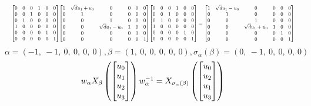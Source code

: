\documentclass[11pt]{article}
\theoremstyle{definition}
\begin{document}
\[
\scaletoalign{\textwidth}{{\left[\begin{matrix}0 & 0 & 0 & 1 & 0 & 0\\0 & 0 & 1 & 0 & 0 & 0\\0 & 1 & 0 & 0 & 0 & 0\\1 & 0 & 0 & 0 & 0 & 0\\0 & 0 & 0 & 0 & 1 & 0\\0 & 0 & 0 & 0 & 0 & 1\end{matrix}\right]} {\left[\begin{matrix}1 & \sqrt{d} u_{1} + u_{0} & 0 & 0 & 0 & 0\\0 & 1 & 0 & 0 & 0 & 0\\0 & 0 & 1 & 0 & 0 & 0\\0 & 0 & \sqrt{d} u_{1} - u_{0} & 1 & 0 & 0\\0 & 0 & 0 & 0 & 1 & 0\\0 & 0 & 0 & 0 & 0 & 1\end{matrix}\right]} {\left[\begin{matrix}0 & 0 & 0 & 1 & 0 & 0\\0 & 0 & 1 & 0 & 0 & 0\\0 & 1 & 0 & 0 & 0 & 0\\1 & 0 & 0 & 0 & 0 & 0\\0 & 0 & 0 & 0 & 1 & 0\\0 & 0 & 0 & 0 & 0 & 1\end{matrix}\right]} = {\left[\begin{matrix}1 & \sqrt{d} u_{1} - u_{0} & 0 & 0 & 0 & 0\\0 & 1 & 0 & 0 & 0 & 0\\0 & 0 & 1 & 0 & 0 & 0\\0 & 0 & \sqrt{d} u_{1} + u_{0} & 1 & 0 & 0\\0 & 0 & 0 & 0 & 1 & 0\\0 & 0 & 0 & 0 & 0 & 1\end{matrix}\right]}}
\]
\[
\alpha = \left( -1, \  -1, \  0, \  0, \  0, \  0\right), \beta = \left( 1, \  0, \  0, \  0, \  0, \  0\right), \sigma_{\alpha}(\beta) = \left( 0, \  -1, \  0, \  0, \  0, \  0\right)
\]
\[
\scaletoalign{\textwidth}{w_{\alpha} X_{\beta}\left(\left[\begin{matrix}u_{0}\\u_{1}\\u_{2}\\u_{3}\end{matrix}\right]\right) w_{\alpha}^{-1} = X_{\sigma_{\alpha}\left(\beta\right)}\left(\left[\begin{matrix}u_{0}\\u_{2}\\u_{1}\\u_{3}\end{matrix}\right]\right)}
\]
\end{document}
